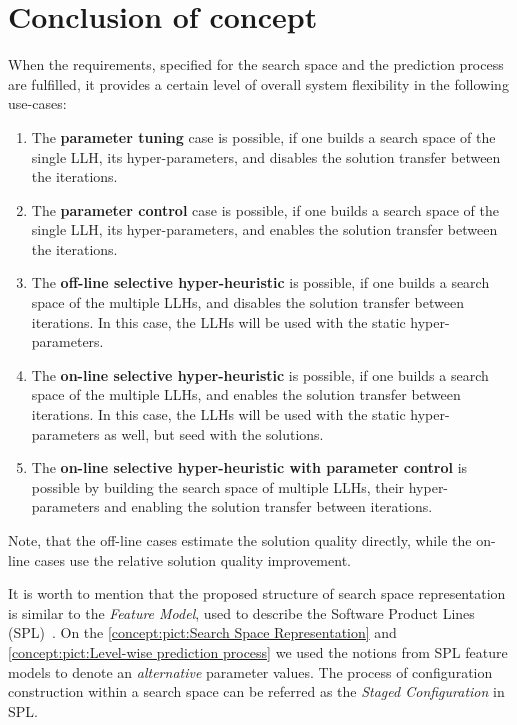 \section{Conclusion of concept}\label{concept: conclution}
When the requirements, specified for the search space and the prediction process are fulfilled, it provides a certain level of overall system flexibility in the following use-cases:
\begin{enumerate}
	\item The \textbf{parameter tuning} case is possible, if one builds a search space of the single LLH, its hyper-parameters, and disables the solution transfer between the iterations.
	
	\item The \textbf{parameter control} case is possible, if one builds a search space of the single LLH, its hyper-parameters, and enables the solution transfer between the iterations. 
	
	\item The \textbf{off-line selective hyper-heuristic} is possible, if one builds a search space of the multiple LLHs, and disables the solution transfer between iterations. In this case, the LLHs will be used with the static hyper-parameters.
	
	\item The \textbf{on-line selective hyper-heuristic} is possible, if one builds a search space of the multiple LLHs, and enables the solution transfer between iterations. In this case, the LLHs will be used with the static hyper-parameters as well, but seed with the solutions.
	
	\item The \textbf{on-line selective hyper-heuristic with parameter control} is possible by building the search space of multiple LLHs, their hyper-parameters and enabling the solution transfer between iterations.
\end{enumerate}

Note, that the off-line cases estimate the solution quality directly, while the on-line cases use the relative solution quality improvement.

It is worth to mention that the proposed structure of search space representation is similar to the \emph{Feature Model}, used to describe the Software Product Lines (SPL)~\cite{schroeter2012multi}. On the \cref{concept:pict:Search Space Representation} and \cref{concept:pict:Level-wise prediction process} we used the notions from SPL feature models to denote an \emph{alternative} parameter values. The process of configuration construction within a search space can be referred as the \emph{Staged Configuration} in SPL.